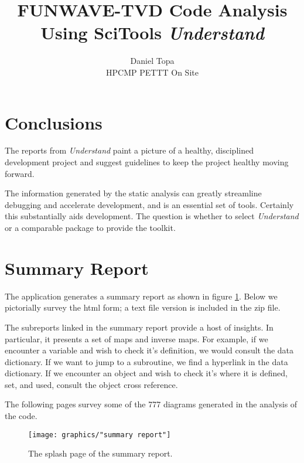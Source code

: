 \documentclass[11pt, oneside]{article}   	%
\title{FUNWAVE-TVD Code Analysis\\Using SciTools \emph{Understand}}
\author{Daniel Topa\\HPCMP PETTT On Site}
\begin{document}
\maketitle
{}

\section{Conclusions}  %
The reports from \emph{Understand} paint a picture of a healthy, disciplined development project and suggest guidelines to keep the project healthy moving forward.

The information generated by the static analysis can greatly streamline debugging and accelerate development, and is an essential set of tools. Certainly this substantially aids development. The question is whether to select \emph{Understand} or a comparable package to provide the toolkit.

\section{Summary Report}  %
The application generates a summary report as shown in figure \ref{fig:summary}. Below we pictorially survey the html form; a text file version is included in the zip file.

The subreports linked in the summary report provide a host of insights. In particular, it presents a set of maps and inverse maps. For example, if we encounter a variable and wish to check it's definition, we would consult the data dictionary. If we want to jump to a subroutine, we find a hyperlink in the data dictionary. If we encounter an object and wish to check it's where it is defined, set, and used, consult the object cross reference.

The following pages survey some of the 777 diagrams generated in the analysis of the code.

\begin{figure}[htbp] %
   \centering
   \texttt{[image: graphics/"summary report"]} 
   \caption{The splash page of the summary report. }
   \label{fig:summary}
\end{figure}
\end{document}
